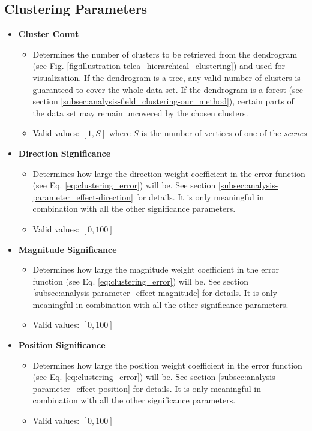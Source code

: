 \subsection{Clustering Parameters}
\label{attch:parameter_desc-clustering_parameters}

\begin{itemize}
\item {\bf Cluster Count}
	\begin{itemize}
		\item Determines the number of clusters to be retrieved from the dendrogram (see Fig. \ref{fig:illustration-telea_hierarchical_clustering}) and used for visualization. If the dendrogram is a tree, any valid number of clusters is guaranteed to cover the whole data set. If the dendrogram is a forest (see section \ref{subsec:analysis-field_clustering-our_method}), certain parts of the data set may remain uncovered by the chosen clusters.
		\item Valid values: \([1,S]\) where \(S\) is the number of vertices of one of the {\it scenes}
	\end{itemize}

\item {\bf Direction Significance} 
	\begin{itemize}
		\item Determines how large the direction weight coefficient in the error function (see Eq. \ref{eq:clustering_error}) will be. See section \ref{subsec:analysis-parameter_effect-direction} for details. It is only meaningful in combination with all the other significance parameters\footnotemark.
		\item Valid values: \([0,100]\)
	\end{itemize}

\item {\bf Magnitude Significance}
	\begin{itemize}
		\item Determines how large the magnitude weight coefficient in the error function (see Eq. \ref{eq:clustering_error}) will be. See section \ref{subsec:analysis-parameter_effect-magnitude} for details. It is only meaningful in combination with all the other significance parameters\footnotemark.
		\item Valid values: \([0,100]\)
	\end{itemize}

\item {\bf Position Significance} 
	\begin{itemize}
		\item Determines how large the position weight coefficient in the error function (see Eq. \ref{eq:clustering_error}) will be. See section \ref{subsec:analysis-parameter_effect-position} for details. It is only meaningful in combination with all the other significance parameters\footnotemark.
		\item Valid values: \([0,100]\)
	\end{itemize}
 


\end{itemize}
